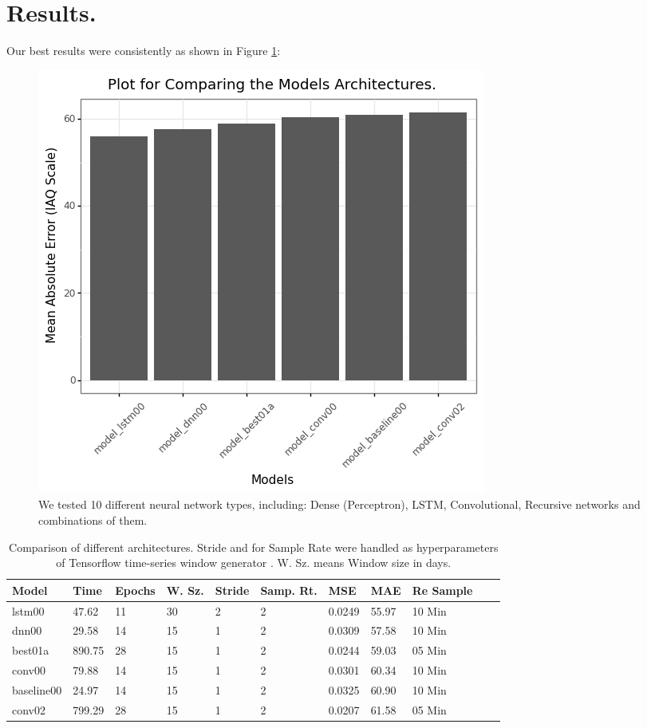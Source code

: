 \documentclass{llncs}
\begin{document}
\hypertarget{results.}{%
\section{Results.}\label{results.}}

Our best results were consistently as shown in 
Figure \ref{fig1}:

\begin{figure}
    \centering
    \includegraphics[scale=0.45]{image01.png}
    \caption{We tested 10 different neural network types, including: Dense
    (Perceptron), LSTM, Convolutional, Recursive networks and combinations
    of them.}
    \label{fig1}
\end{figure}

\begin{table}[!ht]
    \centering
    \begin{tabular}{|l|l|l|l|l|l|l|l|l|l|l|}
    \hline
        Model & Time & Epochs & W. Sz. & Stride & Samp. Rt. & MSE & MAE & Re Sample \\ \hline
        lstm00 & 47.62 & 11 & 30 & 2 & 2 & 0.0249 & 55.97 & 10 Min \\ \hline
        dnn00 & 29.58 & 14 & 15 & 1 & 2 & 0.0309 & 57.58 & 10 Min \\ \hline
        best01a & 890.75 & 28 & 15 & 1 & 2 & 0.0244 & 59.03 &  05 Min \\ \hline
        conv00 & 79.88 & 14 & 15 & 1 & 2 & 0.0301 & 60.34 & 10 Min \\ \hline
        baseline00 & 24.97 & 14 & 15 & 1 & 2 & 0.0325 & 60.90 & 10 Min \\ \hline
        conv02 & 799.29 & 28 & 15 & 1 & 2 & 0.0207 & 61.58 & 05 Min \\ \hline
    \end{tabular}
    \caption{Comparison of different architectures. 
    Stride and for Sample Rate were handled as hyperparameters
    of Tensorflow time-series window generator \cite{kerasWeather,tfTimeseries}. 
    W. Sz. means Window size in days.}
\end{table}
\end{document}
